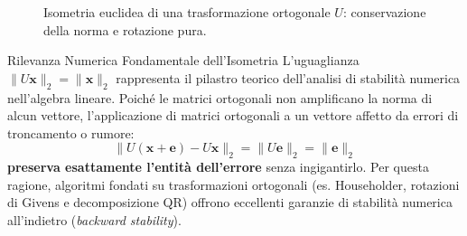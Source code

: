 \begin{figure}[H]
\centering
{}
\caption{Isometria euclidea di una trasformazione ortogonale $U$: conservazione della norma e rotazione pura.}
\label{fig:isometria-ortogonale}
\end{figure}

\begin{noteblock}{Rilevanza Numerica Fondamentale dell'Isometria}
L'uguaglianza $\|U\mathbf{x}\|_2 = \|\mathbf{x}\|_2$ rappresenta il pilastro teorico dell'analisi di stabilit\`a numerica nell'algebra lineare. Poich\'e le matrici ortogonali non amplificano la norma di alcun vettore, l'applicazione di matrici ortogonali a un vettore affetto da errori di troncamento o rumore:
\begin{equation}
    \|U(\mathbf{x} + \mathbf{e}) - U\mathbf{x}\|_2 = \|U\mathbf{e}\|_2 = \|\mathbf{e}\|_2
\end{equation}
\textbf{preserva esattamente l'entit\`a dell'errore} senza ingigantirlo. Per questa ragione, algoritmi fondati su trasformazioni ortogonali (es. Householder, rotazioni di Givens e decomposizione QR) offrono eccellenti garanzie di stabilit\`a numerica all'indietro (\textit{backward stability}).
\end{noteblock}


